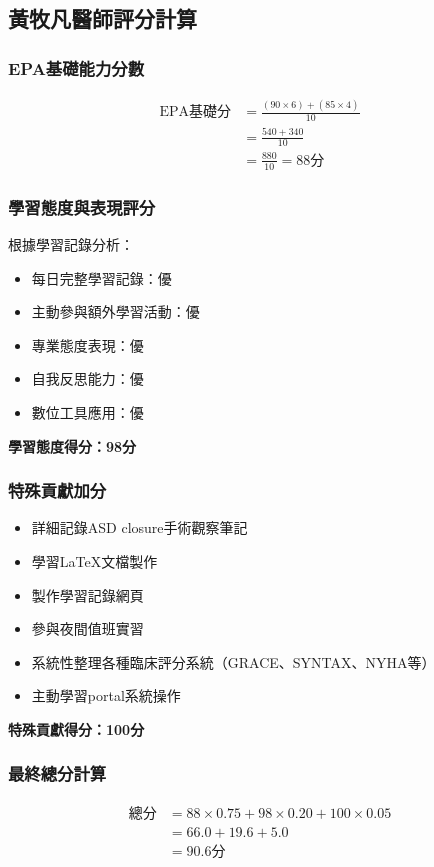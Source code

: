 \documentclass[12pt,a4paper]{article}
\begin{document}
\subsection{黃牧凡醫師評分計算}

\subsubsection{EPA基礎能力分數}
\begin{align}
\text{EPA基礎分} &= \frac{(90 \times 6) + (85 \times 4)}{10}\\
&= \frac{540 + 340}{10}\\
&= \frac{880}{10} = 88\text{分}
\end{align}

\subsubsection{學習態度與表現評分}
根據學習記錄分析：
\begin{itemize}
\item 每日完整學習記錄：優
\item 主動參與額外學習活動：優  
\item 專業態度表現：優
\item 自我反思能力：優
\item 數位工具應用：優
\end{itemize}
\textbf{學習態度得分：98分}

\subsubsection{特殊貢獻加分}
\begin{itemize}
\item 詳細記錄ASD closure手術觀察筆記
\item 學習LaTeX文檔製作
\item 製作學習記錄網頁
\item 參與夜間值班實習
\item 系統性整理各種臨床評分系統（GRACE、SYNTAX、NYHA等）
\item 主動學習portal系統操作
\end{itemize}
\textbf{特殊貢獻得分：100分}

\subsubsection{最終總分計算}
\begin{align}
\text{總分} &= 88 \times 0.75 + 98 \times 0.20 + 100 \times 0.05\\
&= 66.0 + 19.6 + 5.0\\
&= 90.6\text{分}
\end{align}
\end{document}
